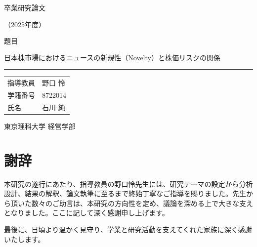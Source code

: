 \documentclass[a4paper,12pt,openany]{jsreport}
\begin{document}
\thispagestyle{empty}
\begin{center}
{\LARGE 卒業研究論文\par}
\vspace{6mm}
{\large （2025年度）\par}
\vspace{18mm}

{\Large 題目\par}
\vspace{4mm}
日本株市場におけるニュースの新規性（Novelty）と株価リスクの関係\par
\vspace{2mm}
\rule{0.9\textwidth}{0.4pt}\par
\vspace{10mm}

\begin{tabular}{p{}p{}}
指導教員 & 野口 怜 \\[2mm]
学籍番号 & 8722014 \\[2mm]
氏名 & 石川 純 \\
\end{tabular}

\vfill
{\large 東京理科大学 経営学部\par}
\end{center}
\clearpage

\tableofcontents
\clearpage
{}







\clearpage
\chapter*{謝辞}
本研究の遂行にあたり、指導教員の野口怜先生には、研究テーマの設定から分析設計、結果の解釈、論文執筆に至るまで終始丁寧なご指導を賜りました。先生から頂いた数々のご助言は、本研究の方向性を定め、議論を深める上で大きな支えとなりました。ここに記して深く感謝申し上げます。

最後に、日頃より温かく見守り、学業と研究活動を支えてくれた家族に深く感謝いたします。

\clearpage
\renewcommand{\bibname}{参考文献}


\clearpage
\appendix

\end{document}
